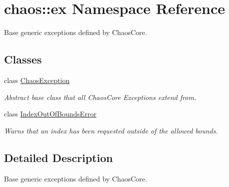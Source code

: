 \hypertarget{namespacechaos_1_1ex}{}\section{chaos\+:\+:ex Namespace Reference}
\label{namespacechaos_1_1ex}


Base generic exceptions defined by Chaos\+Core.  


\subsection*{Classes}
\begin{DoxyCompactItemize}
\item 
class \hyperlink{classchaos_1_1ex_1_1_chaos_exception}{Chaos\+Exception}
\begin{DoxyCompactList}\small\item\em Abstract base class that all Chaos\+Core Exceptions extend from. \end{DoxyCompactList}\item 
class \hyperlink{classchaos_1_1ex_1_1_index_out_of_bounds_error}{Index\+Out\+Of\+Bounds\+Error}
\begin{DoxyCompactList}\small\item\em Warns that an index has been requested outside of the allowed bounds. \end{DoxyCompactList}\end{DoxyCompactItemize}


\subsection{Detailed Description}
Base generic exceptions defined by Chaos\+Core. 